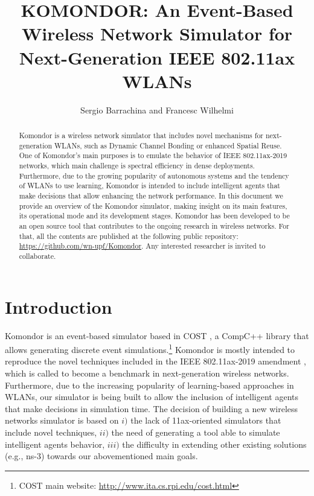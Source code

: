 \documentclass[a4paper]{article}
\title{KOMONDOR: An Event-Based Wireless Network Simulator for Next-Generation IEEE 802.11ax WLANs}
\author{Sergio Barrachina and Francesc Wilhelmi}
\begin{document}
\maketitle

\begin{abstract}
Komondor is a wireless network simulator that includes novel mechanisms for next-generation WLANs, such as Dynamic Channel Bonding or enhanced Spatial Reuse. One of Komondor's main purposes is to emulate the behavior of IEEE 802.11ax-2019 networks, which main challenge is spectral efficiency in dense deployments. Furthermore, due to the growing popularity of autonomous systems and the tendency of WLANs to use learning, Komondor is intended to include intelligent agents that make decisions that allow enhancing the network performance. In this document we provide an overview of the Komondor simulator, making insight on its main features, its operational mode and its development stages. Komondor has been developed to be an open source tool that contributes to the ongoing research in wireless networks. For that, all the contents are published at the following public repository: \url{https://github.com/wn-upf/Komondor}. Any interested researcher is invited to collaborate.
\end{abstract}

\tableofcontents

\listoffigures

\listoftables

\section{Introduction}
\label{section:introduction}
	Komondor is an event-based simulator based in COST \cite{chen2002reusing}, a CompC++ library that allows generating discrete event simulations.\footnote{COST main website: \url{http://www.ita.cs.rpi.edu/cost.html}} Komondor is mostly intended to reproduce the novel techniques included in the IEEE 802.11ax-2019 amendment \cite{tgax2017draft}, which is called to become a benchmark in next-generation wireless networks. Furthermore, due to the increasing popularity of learning-based approaches in WLANs, our simulator is being built to allow the inclusion of intelligent agents that make decisions in simulation time. The decision of building a new wireless networks simulator is based on $i)$ the lack of 11ax-oriented simulators that include novel techniques, $ii)$ the need of generating a tool able to simulate intelligent agents behavior, $iii)$ the difficulty in extending other existing solutions (e.g., ns-3) towards our abovementioned main goals. 
	
\end{document}
